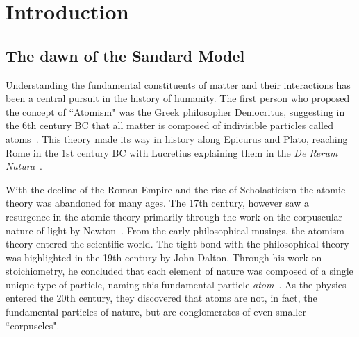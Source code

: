 \renewcommand{\chaptermark}[1]{\markboth{#1}{}}
\renewcommand{\sectionmark}[1]{\markright{#1}}
\fancyhead{} %
\fancyhead[LE]{\chaptername~\thechapter | \leftmark}
\fancyhead[RO]{\thesection~\rightmark}
\fancyfoot{} %
\fancyfoot[LE,RO]{\thepage}

    
\chapter{Introduction}
\label{chp:intro}
\section{The dawn of the Sandard Model}
Understanding the fundamental constituents of matter and their interactions has been a central pursuit in the history of humanity. The first person who proposed the concept of ``Atomism" was the Greek philosopher Democritus, suggesting in the 6th century BC that all matter is composed of indivisible particles called atoms~\cite{laertius1853lives}. 
This theory made its way in history along Epicurus and Plato, reaching Rome in the 1st century BC with Lucretius explaining them in the \textit{De Rerum Natura}~\cite{LucretiusCarus+2019}. 

With the decline of the Roman Empire and the rise of Scholasticism the atomic theory was abandoned for many ages. The 17th century, however saw a resurgence in the atomic theory primarily through the work on the corpuscular nature of light by Newton~\cite{Newton1704-NEWO}. From the early philosophical musings, the atomism theory entered the scientific world. The tight bond with the philosophical theory was highlighted in the 19th century by John Dalton. Through his work on stoichiometry, he concluded that each element of nature was composed of a single unique type of particle, naming this fundamental particle \textit{atom}~\cite{Dalton}. As the physics entered the 20th century, they discovered that atoms are not, in fact, the fundamental particles of nature, but are conglomerates of even smaller ``corpuscles".

